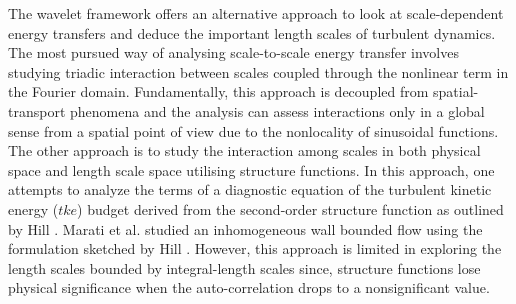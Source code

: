 The wavelet framework offers an alternative approach to look at scale-dependent energy transfers and deduce the important length scales of turbulent dynamics. The most pursued way of analysing scale-to-scale energy transfer involves studying triadic interaction between scales coupled through the nonlinear term in the Fourier domain. Fundamentally, this approach is decoupled from spatial-transport phenomena and the analysis can assess interactions only in a global sense from a spatial point of view due to the nonlocality of sinusoidal functions. The other approach is to study the interaction among scales in both physical space and length scale  space utilising structure functions. In this approach, one attempts to analyze the terms of a diagnostic equation of the turbulent kinetic energy ($tke$) budget derived from the second-order structure function as outlined by Hill \citep{hill_jfm2002}. Marati et al. \citep{marati_jfm_2004} studied an inhomogeneous wall bounded flow using the formulation sketched by Hill \citep{hill_jfm2002}. However, this approach is limited in exploring the length scales bounded by integral-length scales since, structure functions lose physical significance when the auto-correlation drops to a nonsignificant value. 


